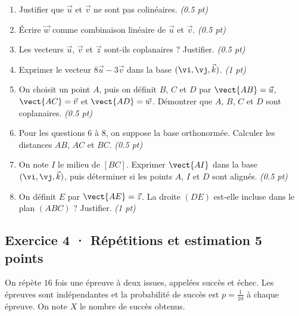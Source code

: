 \begin{enumerate}

\item Justifier que $\vec u$ et $\vec v$ ne sont pas colinéaires. \hfill\textit{(\num{0,5} pt)}

\item Écrire $\vec w$ comme combinaison linéaire de $\vec u$ et $\vec v$. \hfill\textit{(\num{0,5} pt)}

\item Les vecteurs $\vec u$, $\vec v$ et $\vec z$ sont-ils coplanaires ? Justifier. \hfill\textit{(\num{0,5} pt)}

\item Exprimer le vecteur $8\vec u-3\vec v$ dans la base $(\vi,\vj,\vec k)$. \hfill\textit{(1 pt)}

\item On choisit un point $A$, puis on définit $B$, $C$ et $D$ par $\vect{AB}=\vec u$, $\vect{AC}=\vec v$ et $\vect{AD}=\vec w$. Démontrer que $A$, $B$, $C$ et $D$ sont coplanaires. \hfill\textit{(\num{0,5} pt)}

\item Pour les questions 6 à 8, on suppose la base orthonormée. Calculer les distances $AB$, $AC$ et $BC$. \hfill\textit{(\num{0,5} pt)}

\item On note $I$ le milieu de $[BC]$. Exprimer $\vect{AI}$ dans la base $(\vi,\vj,\vec k)$, puis déterminer si les points $A$, $I$ et $D$ sont alignés. \hfill\textit{(\num{0,5} pt)}

\item On définit $E$ par $\vect{AE}=\vec z$. La droite $(DE)$ est-elle incluse dans le plan $(ABC)$ ? Justifier. \hfill\textit{(1 pt)}

\end{enumerate}

\subsection*{Exercice 4 · Répétitions et estimation \hfill 5 points}On répète $16$ fois une épreuve à deux issues, appelées succès et échec. Les épreuves sont indépendantes et la probabilité de succès est $p=\frac{1}{10}$ à chaque épreuve. On note $X$ le nombre de succès obtenus.

